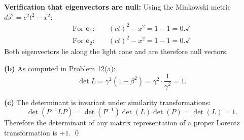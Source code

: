 \documentclass[12pt]{article}
\begin{document}
\textbf{Verification that eigenvectors are null:} Using the Minkowski metric $ds^2 = c^2t^2 - x^2$:
\begin{align*}
\text{For } \mathbf{e}_1: &\quad (ct)^2 - x^2 = 1 - 1 = 0. \checkmark \\
\text{For } \mathbf{e}_2: &\quad (ct)^2 - x^2 = 1 - 1 = 0. \checkmark
\end{align*}
Both eigenvectors lie along the light cone and are therefore null vectors.

\bigskip
\textbf{(b)} As computed in Problem 12(a):
\[
\det L = \gamma^2(1-\beta^2) = \gamma^2 \cdot \frac{1}{\gamma^2} = 1.
\]

\bigskip
\textbf{(c)} The determinant is invariant under similarity transformations:
\[
\det(P^{-1}LP) = \det(P^{-1})\det(L)\det(P) = \det(L) = 1.
\]
Therefore the determinant of any matrix representation of a proper Lorentz transformation is $+1$. \qed
\end{document}
